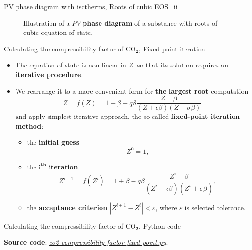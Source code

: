 \begin{frame}{PV phase diagram with isotherms, Roots of cubic EOS \, ii}
\begin{figure}
\caption{\footnotesize Illustration of a $PV$ \textbf{phase diagram} of a substance with roots of cubic equation of state.}
\end{figure}
\ecol
\end{frame}
%
\begin{frame}{Calculating the compressibility factor of CO$_{\boldsymbol{2}}$, Fixed point iteration}
\begin{itemize}
\item The equation of state is non-linear in $Z$, so that its solution requires an \textbf{iterative procedure}.
%
\pause
\item We rearrange it to a more convenient form for \textbf{the largest root} computation \citep{Smith2005}
\[
\boxed{Z = f(Z) = 1+\beta-q\beta\frac{Z-\beta}{(Z+\epsilon\beta)(Z+\sigma\beta)}}
\]
and apply simplest iterative approach, the so-called \alert{\textbf{fixed-point iteration method}}: 
\begin{itemize}
\item the \textbf{initial guess} 
\[
Z^{0}=1,
\]
\item the $\boldsymbol{i^{\text{th}}}$ \textbf{iteration}
\[
Z^{i+1} =f(Z^{i})= 1+\beta-q\beta\frac{Z^{i}-\beta}{(Z^{i}+\epsilon\beta)(Z^{i}+\sigma\beta)}, 
\]
%
\item the \textbf{acceptance criterion} $|Z^{i+1}-Z^{i}|<\varepsilon$, where $\varepsilon$ is selected tolerance.
\end{itemize}
\end{itemize}
\end{frame}
%
%
\begin{frame}{Calculating the compressibility factor of CO$_{\boldsymbol{2}}$, Python code}



\textbf{Source code}: \href{https://polybox.ethz.ch/index.php/s/39Sznpv0Eirt45B}{\textcolor{indigo(dye)}{\it co2-compressibility-factor-fixed-point.py}}.

\end{frame}
%
